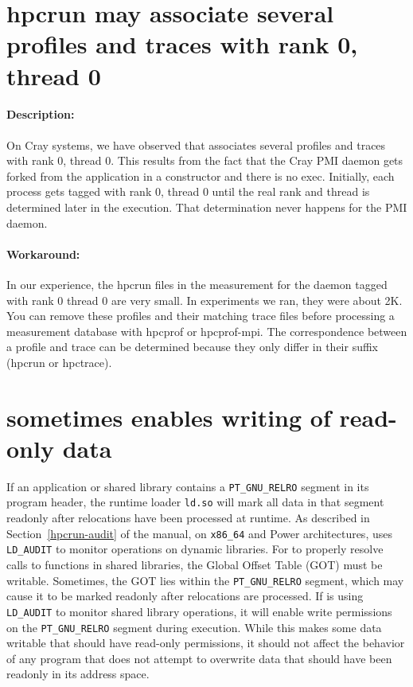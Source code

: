 \documentclass[11pt,twoside,letterpaper]{report}
\begin{document}
\section{hpcrun{} may associate several profiles and traces with rank 0, thread 0}

\paragraph{Description:}  On Cray systems, we have observed that \hpcrun{} associates several profiles and traces with rank 0, thread 0. This results from the fact that the Cray PMI daemon gets forked from the application in a constructor and there is no exec. Initially, each process gets tagged with rank 0, thread 0 until the real rank and thread is determined later in the execution. That determination never happens for the PMI daemon.

\paragraph{Workaround:} In our experience, the hpcrun files in the measurement for the daemon tagged with rank 0 thread 0 are very small. In experiments we ran, they were about 2K. You can remove these profiles and their matching trace files before processing a measurement database with hpcprof or hpcprof-mpi. The correspondence between a profile and trace can be determined because they only differ in their suffix (hpcrun or hpctrace).

\section{\hpcrun{} sometimes enables writing of read-only data}

If an application or shared library contains a \verb|PT_GNU_RELRO| segment in its program header, the runtime loader \verb|ld.so| will mark all data in that segment readonly
after relocations have been processed at runtime.
As described in Section~\ref{hpcrun-audit} of the manual, on \verb|x86_64| and Power architectures, \hpcrun{} uses \verb|LD_AUDIT| to monitor operations on dynamic libraries.
For \hpcrun{} to properly resolve calls to functions in shared libraries, the Global Offset Table (GOT) must be writable. Sometimes, the GOT lies within the \verb|PT_GNU_RELRO| segment, which may cause it to be marked readonly after relocations are processed.
If \hpcrun{} is using   \verb|LD_AUDIT| to monitor shared library operations, it will enable write permissions on the \verb|PT_GNU_RELRO| segment during execution. While this makes some data writable that should have read-only permissions, it should not affect the behavior of any program that does not attempt to overwrite data that should have been readonly in its address space.
\end{document}
